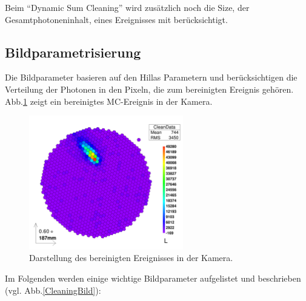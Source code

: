 Beim ``Dynamic Sum Cleaning'' wird zusätzlich noch die Size, der Gesamtphotoneninhalt, eines Ereignisses mit berücksichtigt.

\subsection{Bildparametrisierung}
Die Bildparameter basieren auf den Hillas Parametern \cite{Hillas} und berücksichtigen die Verteilung der Photonen in den Pixeln, die zum bereinigten Ereignis gehören.
Abb.\ref{Kamera-Bild-gecleant} zeigt ein bereinigtes MC-Ereignis in der Kamera.

\begin{figure}
    \centering
    \includegraphics[width=0.6\textwidth]{./Plots/03_MonteCarlos/Signal_gecleant_fertig.png}
    \caption{Darstellung des bereinigten Ereignisses in der Kamera.}
    \label{Kamera-Bild-gecleant}
\end{figure}


Im Folgenden werden einige wichtige Bildparameter aufgelistet und beschrieben (vgl. Abb.\ref{CleaningBild}):


